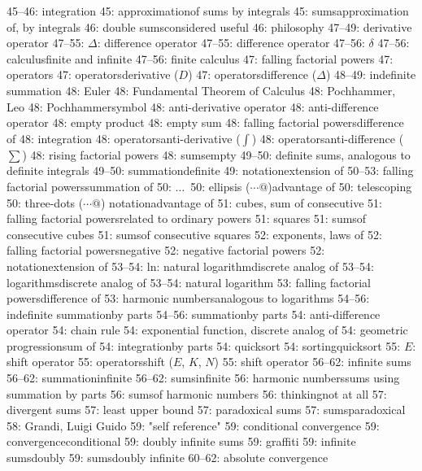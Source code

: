  45--46: integration
 45: approximation\sub of sums by integrals
 45: sums\sub approximation of, by integrals
 46: double sums\sub considered useful
 46: philosophy
 47--49: derivative operator
 47--55: $\Delta$: difference operator
 47--55: difference operator
 47--56: $\delta$
 47--56: calculus\sub finite and infinite
 47--56: finite calculus
 47: falling factorial powers
 47: operators
 47: operators\sub derivative ($D$)
 47: operators\sub difference ($\Delta$)
 48--49: indefinite summation
 48: Euler
 48: Fundamental Theorem of Calculus
 48: Pochhammer, Leo
 48: Pochhammer\sub symbol
 48: anti-derivative operator
 48: anti-difference operator
 48: empty product
 48: empty sum
 48: falling factorial powers\sub difference of
 48: integration
 48: operators\sub anti-derivative ($\int$)
 48: operators\sub anti-difference ($\sum$)
 48: rising factorial powers
 48: sums\sub empty
 49--50: definite sums, analogous to definite integrals
 49--50: summation\sub definite
 49: notation\sub extension of
 50--53: falling factorial powers\sub summation of
 50: $\ldots\,$
 50: ellipsis ($\cdots@$)\sub advantage of
 50: telescoping
 50: three-dots ($\cdots@$) notation\sub advantage of
 51: cubes, sum of consecutive
 51: falling factorial powers\sub related to ordinary powers
 51: squares
 51: sums\sub of consecutive cubes
 51: sums\sub of consecutive squares
 52: exponents, laws of
 52: falling factorial powers\sub negative
 52: negative factorial powers
 52: notation\sub extension of
 53--54: ln: natural logarithm\sub discrete analog of
 53--54: logarithms\sub discrete analog of
 53--54: natural logarithm
 53: falling factorial powers\sub difference of
 53: harmonic numbers\sub analogous to logarithms
 54--56: indefinite summation\sub by parts
 54--56: summation\sub by parts
 54: anti-difference operator
 54: chain rule
 54: exponential function, discrete analog of
 54: geometric progression\sub sum of
 54: integration\sub by parts
 54: quicksort
 54: sorting\sub quicksort
 55: $E$: shift operator
 55: operators\sub shift ($E$, $K$, $N$)
 55: shift operator
 56--62: infinite sums
 56--62: summation\sub infinite
 56--62: sums\sub infinite
 56: harmonic numbers\sub sums using summation by parts
 56: sums\sub of harmonic numbers
 56: thinking\sub not at all
 57: divergent sums
 57: least upper bound
 57: paradoxical sums
 57: sums\sub paradoxical
 58: Grandi, Luigi Guido
 59: "self reference"
 59: conditional convergence
 59: convergence\sub conditional
 59: doubly infinite sums
 59: graffiti
 59: infinite sums\sub doubly
 59: sums\sub doubly infinite
 60--62: absolute convergence
